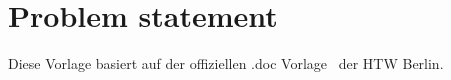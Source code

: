 \chapter{Problem statement}
\label{cha:problem-statement}

Diese Vorlage basiert auf der offiziellen .doc Vorlage~\cite{vorlagen} der HTW Berlin.
